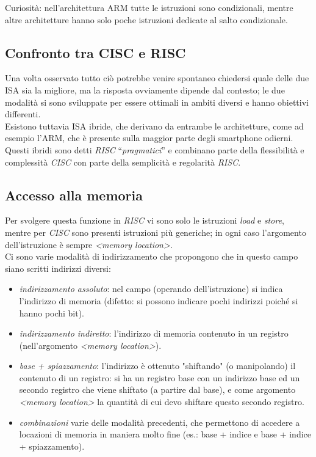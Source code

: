 \documentclass[class=book, crop=false]{standalone}
\begin{document}
Curiosità: nell'architettura ARM tutte le istruzioni sono condizionali, mentre altre architetture hanno solo poche istruzioni dedicate al salto condizionale.

\subsection{Confronto tra CISC e RISC}
Una volta osservato tutto ciò potrebbe venire spontaneo chiedersi quale delle due ISA sia la migliore, ma la risposta ovviamente dipende dal contesto; le due modalità si sono sviluppate per essere ottimali in ambiti diversi e hanno obiettivi differenti.\\
Esistono tuttavia ISA ibride, che derivano da entrambe le architetture, come ad esempio l’ARM, che è presente sulla maggior parte degli smartphone odierni. Questi ibridi sono detti \emph{RISC} “\emph{pragmatici}” e combinano parte della flessibilità e complessità  \emph{CISC} con parte della semplicità e regolarità \emph{RISC}.

\subsection{Accesso alla memoria}
Per svolgere questa funzione in \emph{RISC} vi sono solo le istruzioni \emph{load} e \emph{store}, mentre per \emph{CISC} sono presenti istruzioni più generiche; in ogni caso l’argomento dell’istruzione è sempre \emph{<memory location>}.\\
Ci sono varie modalità di indirizzamento che propongono che in questo campo siano scritti indirizzi diversi:
\begin{itemize}
	\item \emph{indirizzamento assoluto}: nel campo (operando dell’istruzione) si indica l’indirizzo di memoria (difetto: si possono indicare pochi indirizzi poiché si hanno pochi bit).
	\item \emph{indirizzamento indiretto}: l’indirizzo di memoria contenuto in un registro (nell’argomento \emph{<memory location>}).
	\item \emph{base + spiazzamento}: l’indirizzo è ottenuto "shiftando" (o manipolando) il contenuto di un registro: si ha un registro base con un indirizzo base ed un secondo registro che viene shiftato (a partire dal base), e come argomento \emph{<memory location>} la quantità di cui devo shiftare questo secondo registro.
	\item \emph{combinazioni} varie delle modalità precedenti, che permettono di accedere a locazioni di memoria in maniera molto fine (es.: base + indice e base + indice + spiazzamento).
\end{itemize}
\end{document}

